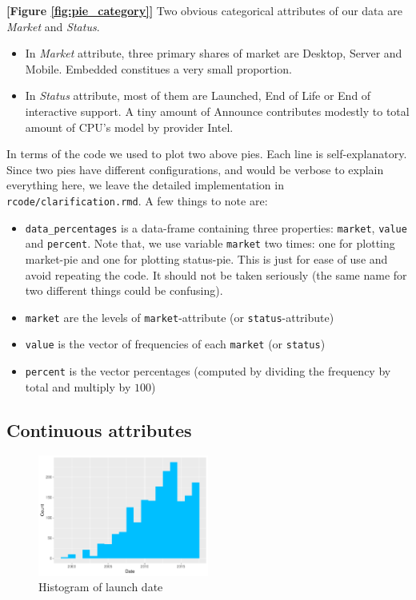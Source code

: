 \textbf{[Figure \ref{fig:pie_category}]} Two obvious categorical attributes of our data are \textit{Market} and \textit{Status}.
\begin{itemize}
    \item In \textit{Market} attribute, three primary shares of market are Desktop, Server and Mobile. Embedded constitues a very small
    proportion.
    \item In \textit{Status} attribute, most of them are Launched, End of Life or End of interactive support. A tiny amount of Announce
    contributes modestly to total amount of CPU's model by provider Intel.
\end{itemize}

In terms of the code we used to plot two above pies. Each line is self-explanatory. Since two pies have different configurations, and would be
verbose to explain everything here, we leave the detailed implementation in \verb|rcode/clarification.rmd|. A few things to note are:
\begin{itemize}
    \item \verb|data_percentages| is a data-frame containing three properties: \verb|market|, \verb|value| and \verb|percent|.
    Note that, we use variable \verb|market| two times: one for plotting market-pie and one for plotting status-pie. This is just for ease
    of use and avoid repeating the code. It should not be taken seriously (the same name for two different things could be confusing).
    \item \verb|market| are the levels of \verb|market|-attribute (or \verb|status|-attribute)
    \item \verb|value| is the vector of frequencies of each \verb|market| (or \verb|status|)
    \item \verb|percent| is the vector percentages (computed by dividing the frequency by total and multiply by $100$)
\end{itemize}





\subsection{Continuous attributes}

\begin{figure}[H]
    \centering
    \includegraphics[width=0.5\textwidth]{./graphics/hist_ldate.pdf}
    \caption{Histogram of launch date}
    \label{fig:hist_ldate}
\end{figure}

